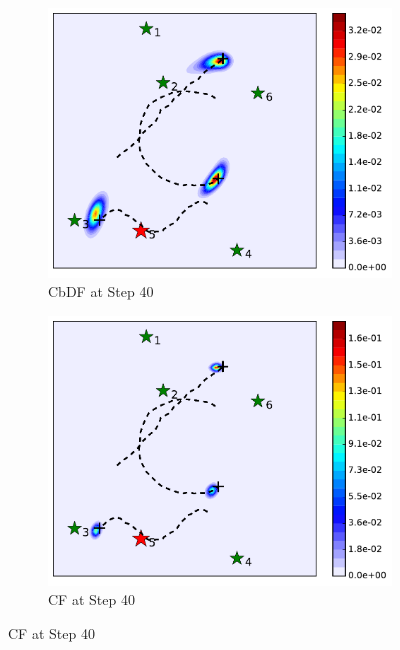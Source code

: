 \begin{figure}
\begin{subfigure}[b]{0.23\textwidth}
			\includegraphics[width=\textwidth]{figures/cons_hetero_mov_sen_mov_tar_rbt5_step40}
			\caption{CbDF at Step 40}\label{fig:cbdf_step40}
		\end{subfigure}	
		\begin{subfigure}[b]{0.23\textwidth}
			\includegraphics[width=\textwidth]{figures/cent_hetero_mov_sen_mov_tar_rbt1_step40}
			\caption{CF at Step 40}\label{fig:cf_step40}
		\end{subfigure}	

\end{figure}
